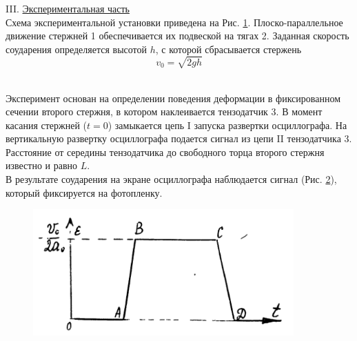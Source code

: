 \documentclass[specialist, subf, href, colorlinks=true, 14pt, final]{disser}
\theoremstyle{definition}
\begin{document}
III. \underline{Экспериментальная часть}\\
Схема экспериментальной установки приведена на Рис. \ref{1-1-3}. 
Плоско-параллельное движение стержней 1 обеспечивается их подвеской на тягах 2. Заданная скорость соударения определяется высотой $h$, с которой сбрасывается стержень
\[
  v_{0} = \sqrt{2gh}
\]
\begin{figure}[!htp]
  \caption{}
  \label{1-1-3}
\end{figure}
\\
Эксперимент основан на определении поведения деформации в фиксированном сечении второго стержня, в котором наклеивается тензодатчик 3. В момент касания стержней ($t = 0$) замыкается цепь I запуска развертки осциллографа. На вертикальную развертку осциллографа подается сигнал из цепи II тензодатчика 3. Расстояние от середины тензодатчика до свободного торца второго стержня известно и равно $L$.\\
В результате соударения на экране осциллографа наблюдается сигнал (Рис. \ref{1-1-4}), который фиксируется на фотопленку.\\
\begin{figure} 
  \includegraphics[width=100mm]{pics/1-1-4.png}
  \caption{}
  \label{1-1-4}
\end{figure}
\\
\end{document}
